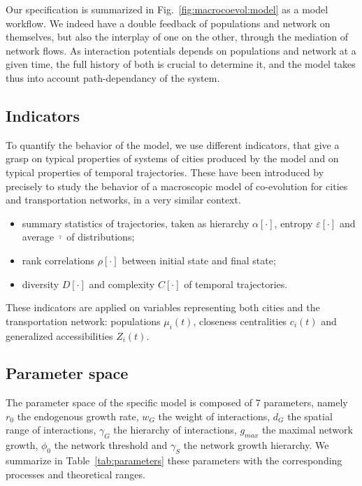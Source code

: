 \documentclass[11pt]{article}
\begin{document}
Our specification is summarized in Fig.~\ref{fig:macrocoevol:model} as a model workflow. We indeed have a double feedback of populations and network on themselves, but also the interplay of one on the other, through the mediation of network flows. As interaction potentials depends on populations and network at a given time, the full history of both is crucial to determine it, and the model takes thus into account path-dependancy of the system.


\subsection{Indicators}

To quantify the behavior of the model, we use different indicators, that give a grasp on typical properties of systems of cities produced by the model and on typical properties of temporal trajectories. These have been introduced by \cite{2018arXiv180900861R} precisely to study the behavior of a macroscopic model of co-evolution for cities and transportation networks, in a very similar context.
\begin{itemize}
	\item summary statistics of trajectories, taken as hierarchy $\alpha\left[\cdot\right]$, entropy $\varepsilon\left[\cdot\right]$ and average $\bar{\cdot}$ of distributions;
	\item rank correlations $\rho\left[\cdot\right]$ between initial state and final state;
	\item diversity $D\left[\cdot\right]$ and complexity $C\left[\cdot\right]$ of temporal trajectories.
\end{itemize}

These indicators are applied on variables representing both cities and the transportation network: populations $\mu_i(t)$, closeness centralities $c_i (t)$ and generalized accessibilities $Z_i (t)$.


\subsection{Parameter space}

The parameter space of the specific model is composed of 7 parameters, namely $r_0$ the endogenous growth rate, $w_G$ the weight of interactions, $d_G$ the spatial range of interactions, $\gamma_G$ the hierarchy of interactions, $g_{max}$ the maximal network growth, $\phi_0$ the network threshold and $\gamma_S$ the network growth hierarchy. We summarize in Table~\ref{tab:parameters} these parameters with the corresponding processes and theoretical ranges.
\end{document}
